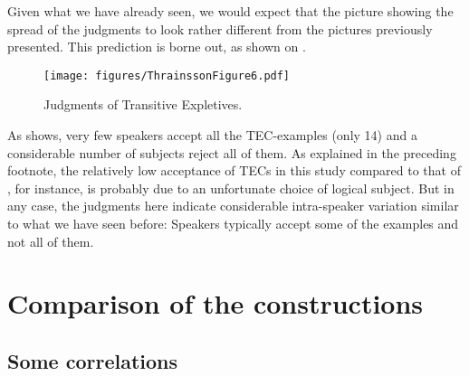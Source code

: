 \documentclass[output=paper]{LSP/langsci}
\begin{document}
Given what we have already seen, we would expect that the picture showing the spread of the judgments to look rather different from the pictures previously presented. This prediction is borne out, as shown on .

 
\begin{figure}

\texttt{[image: figures/ThrainssonFigure6.pdf]}
\caption{Judgments of Transitive Expletives\label{fig:Thrainsson:4}.}
\end{figure}

As  shows, very few speakers accept all the TEC-examples (only 14) and a considerable number of subjects reject all of them. As explained in the preceding footnote, the relatively low acceptance of TECs in this study compared to that of \citet{Angantýsson2011}, for instance, is probably due to an unfortunate choice of logical subject. But in any case, the judgments here indicate considerable intra-speaker variation similar to what we have seen before: Speakers typically accept some of the examples and not all of them.

\section{Comparison of the constructions}\label{sec:Thrainsson:4}
\subsection{Some correlations}
\end{document}
